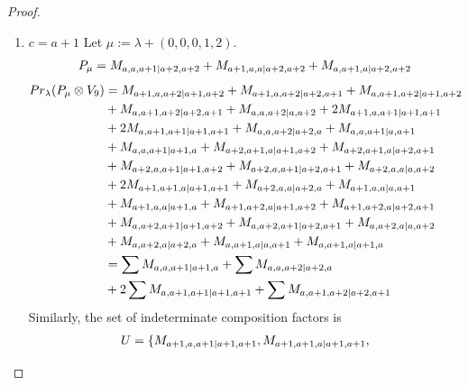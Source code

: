 \begin{proof}
\begin{enumerate}
\begin{enumerate}
      \item $c=a+1$ 
        Let $\mu:=\lambda + (0,0,0,1,2) $.
        \begin{equation}\notag
          \begin{aligned}
            P_\mu = M_{a,a,a+1|a+2,a+2}
+ M_{a+1,a,a|a+2,a+2}
+ M_{a,a+1,a|a+2,a+2}
          \end{aligned}
        \end{equation}
        \begin{equation}\notag
          \begin{aligned}
            Pr_{\lambda}(P_\mu \otimes V_{9}) &=
M_{a+1,a,a+2|a+1,a+2}
+ M_{a+1,a,a+2|a+2,a+1}
+ M_{a,a+1,a+2|a+1,a+2}\\
                                              &
+ M_{a,a+1,a+2|a+2,a+1}
+ M_{a,a,a+2|a,a+2}
+ 2M_{a+1,a,a+1|a+1,a+1}\\
                                              &
+ 2M_{a,a+1,a+1|a+1,a+1}
+ M_{a,a,a+2|a+2,a}
+ M_{a,a,a+1|a,a+1}\\
                                              &
+ M_{a,a,a+1|a+1,a}
+ M_{a+2,a+1,a|a+1,a+2}
+ M_{a+2,a+1,a|a+2,a+1}\\
                                              &
+ M_{a+2,a,a+1|a+1,a+2}
+ M_{a+2,a,a+1|a+2,a+1}
+ M_{a+2,a,a|a,a+2}\\
                                              &
+ 2M_{a+1,a+1,a|a+1,a+1}
+ M_{a+2,a,a|a+2,a}
+ M_{a+1,a,a|a,a+1}\\
                                              &
+ M_{a+1,a,a|a+1,a}
+ M_{a+1,a+2,a|a+1,a+2}
+ M_{a+1,a+2,a|a+2,a+1}\\
                                              &
+ M_{a,a+2,a+1|a+1,a+2}
+ M_{a,a+2,a+1|a+2,a+1}
+ M_{a,a+2,a|a,a+2}\\
                                              &
+ M_{a,a+2,a|a+2,a}
+ M_{a,a+1,a|a,a+1}
+ M_{a,a+1,a|a+1,a} \\
                                               &=
\sum M_{a,a,a+1|a+1,a}
+ \sum M_{a,a,a+2|a+2,a}\\
                                              &
+ 2\sum M_{a,a+1,a+1|a+1,a+1}
+ \sum M_{a,a+1,a+2|a+2,a+1}
          \end{aligned}
        \end{equation}
      Similarly, the set of indeterminate composition factors is 
\begin{equation}\notag
  \begin{aligned}
    U = \{
M_{a+1,a,a+1|a+1,a+1},
M_{a+1,a+1,a|a+1,a+1},

\end{aligned}
\end{equation}
\end{enumerate}
\end{enumerate}
\end{proof}
